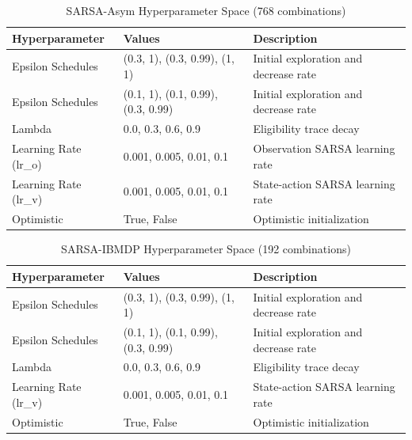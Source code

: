 \begin{table}
\small
\centering
\caption{SARSA-Asym Hyperparameter Space (768 combinations)}\label{tab:sarsa-asym-hp}
\begin{tabular}{lll}
\toprule
\textbf{Hyperparameter} & \textbf{Values} & \textbf{Description} \\
\midrule
Epsilon Schedules & (0.3, 1), (0.3, 0.99), (1, 1) & Initial exploration and decrease rate \\
Epsilon Schedules & (0.1, 1), (0.1, 0.99), (0.3, 0.99) & Initial exploration and decrease rate \\
Lambda & 0.0, 0.3, 0.6, 0.9 & Eligibility trace decay \\
Learning Rate (lr\_o) & 0.001, 0.005, 0.01, 0.1 & Observation SARSA learning rate \\
Learning Rate (lr\_v) & 0.001, 0.005, 0.01, 0.1 & State-action SARSA learning rate \\
Optimistic & True, False & Optimistic initialization \\
\bottomrule
\end{tabular}
\end{table}

\begin{table}
\small
\centering
\caption{SARSA-IBMDP Hyperparameter Space (192 combinations)}
\begin{tabular}{lll}
\toprule
\textbf{Hyperparameter} & \textbf{Values} & \textbf{Description} \\
\midrule
Epsilon Schedules & (0.3, 1), (0.3, 0.99), (1, 1) & Initial exploration and decrease rate \\
Epsilon Schedules & (0.1, 1), (0.1, 0.99), (0.3, 0.99) & Initial exploration and decrease rate \\
Lambda & 0.0, 0.3, 0.6, 0.9 & Eligibility trace decay \\
Learning Rate (lr\_v) & 0.001, 0.005, 0.01, 0.1 & State-action SARSA learning rate \\
Optimistic & True, False & Optimistic initialization \\
\bottomrule
\end{tabular}
\end{table}

